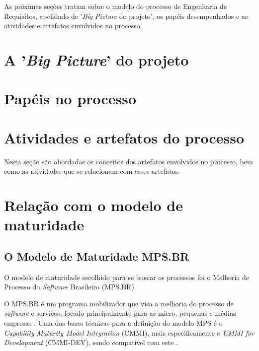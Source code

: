   As próximas seções tratam sobre o modelo do processo de Engenharia de Requisitos, apelidado de '\textit{Big Picture}
  do projeto', os papéis desempenhados e as atividades e artefatos envolvidos no processo.
  
  \pagebreak
  \section{A '\textit{Big Picture}' do projeto}

      
    
  \pagebreak
  \section{Papéis no processo}
    
    
    
  \pagebreak
  \section{Atividades e artefatos do processo}
    
    Nesta seção são abordadas os conceitos dos artefatos envolvidos no processo, bem como as atividades que se relacionam com
    esses artefatos.
    
    
  
  \pagebreak
  \section{Relação com o modelo de maturidade}
  
    \subsection{O Modelo de Maturidade MPS.BR}
    
      O modelo de maturidade escolhido para se buscar os processos foi o Melhoria de Processo do \textit{Software} Brasileiro (MPS.BR).
      
      O MPS.BR é um programa mobilizador que visa a melhoria do processo de \textit{software} e serviços, focado principalmente
      para as micro, pequenas e médias empresas \cite{softex12}.
      Uma das bases técnicas para a definição do modelo MPS é o \textit{Capability Maturity Model Integration} (CMMI), mais especificamente
      o \textit{CMMI for Development} (CMMI-DEV\textregistered), sendo compatível com este \cite{softex12}.
      
